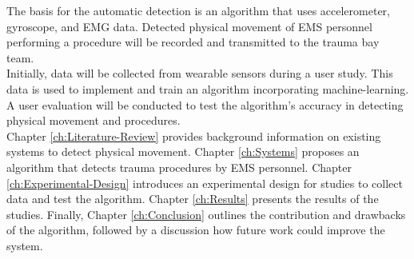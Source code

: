 The basis for the automatic detection is an algorithm that uses accelerometer, gyroscope, and \gls{EMG} data. Detected physical movement of \gls{EMS} personnel performing a procedure will be recorded and transmitted to the trauma bay team.\\
Initially, data will be collected from wearable sensors during a user study. This data is used to implement and train an algorithm incorporating machine-learning. A user evaluation will be conducted to test the algorithm's accuracy in detecting physical movement and procedures.\\
Chapter \ref{ch:Literature-Review} provides background information on existing systems to detect physical movement. Chapter \ref{ch:Systems} proposes an algorithm that detects trauma procedures by \gls{EMS} personnel. Chapter \ref{ch:Experimental-Design} introduces an experimental design for studies to collect data and test the algorithm. Chapter \ref{ch:Results} presents the results of the studies. Finally, Chapter  \ref{ch:Conclusion} outlines the contribution and drawbacks of the algorithm, followed by a discussion how future work could improve the system. 